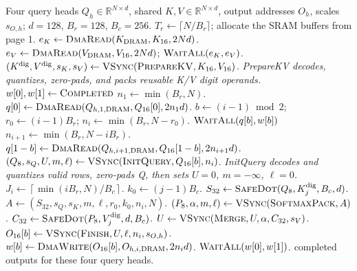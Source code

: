 \documentclass[11pt]{article}
\newcommand{\VSync}{\textsc{VSync}}
\newcommand{\SafeDot}{\textsc{SafeDot}}
\begin{document}
\clearpage
\begin{algorithm}[H]
\caption{Control-CPU program for one batch item and one shared K/V head}
\label{alg:main}
\footnotesize
\begin{algorithmic}[1]
\Require Four query heads $Q_h\in\mathbb R^{N\times d}$, shared $K,V\in\mathbb R^{N\times d}$,
output addresses $O_h$, scales $s_{O,h}$; $d=128$, $B_r=128$, $B_c=256$.
\State $T_r\gets\lceil N/B_r\rceil$; allocate the SRAM buffers from page 1.
\State $e_K\gets\Call{DmaRead}{K_{\rm DRAM},K_{16},2Nd}$.
\State $e_V\gets\Call{DmaRead}{V_{\rm DRAM},V_{16},2Nd}$; $\Call{WaitAll}{e_K,e_V}$.
\State $(K^{\rm dig},V^{\rm dig},s_K,s_V)\gets\VSync(\textsc{PrepareKV},K_{16},V_{16})$.
\Statex \hspace{\algorithmicindent}\textit{PrepareKV decodes, quantizes, zero-pads, and packs reusable K/V digit operands.}
    \State $w[0],w[1]\gets\textsc{Completed}$ 
    \State $n_1\gets\min(B_r,N)$.
    \State $q[0]\gets\Call{DmaRead}{Q_{h,1,\rm DRAM},Q_{16}[0],2n_1d}$.
        \State $b\gets(i-1)\bmod2$; $r_0\gets(i-1)B_r$; $n_i\gets\min(B_r,N-r_0)$.
        \State $\Call{WaitAll}{q[b],w[b]}$ 
            \State $n_{i+1}\gets\min(B_r,N-iB_r)$.
            \State $q[1-b]\gets\Call{DmaRead}{Q_{h,i+1,\rm DRAM},Q_{16}[1-b],2n_{i+1}d}$.
        \EndIf
        \State $(Q_8,s_Q,U,m,\ell)\gets\VSync(\textsc{InitQuery},Q_{16}[b],n_i)$.
        \Statex \hspace{\algorithmicindent}\hspace{\algorithmicindent}\textit{InitQuery decodes and quantizes valid rows, zero-pads Q, then sets $U=0$, $m=-\infty$, $\ell=0$.}
        \State $J_i\gets\left\lceil\min(iB_r,N)/B_c\right\rceil$.
            \State $k_0\gets(j-1)B_c$.
            \State $S_{32}\gets\SafeDot(Q_8,K^{\rm dig}_j,B_c,d)$.
            \State $A\gets(S_{32},s_Q,s_K,m,\ell,r_0,k_0,n_i,N)$.
            \State $(P_8,\alpha,m,\ell)\gets\VSync(\textsc{SoftmaxPack},A)$.
            \State $C_{32}\gets\SafeDot(P_8,V^{\rm dig}_j,d,B_c)$.
            \State $U\gets\VSync(\textsc{Merge},U,\alpha,C_{32},s_V)$.
        \EndFor
        \State $O_{16}[b]\gets\VSync(\textsc{Finish},U,\ell,n_i,s_{O,h})$.
        \State $w[b]\gets\Call{DmaWrite}{O_{16}[b],O_{h,i,\rm DRAM},2n_id}$.
    \EndFor
    \State $\Call{WaitAll}{w[0],w[1]}$.
\EndFor
\State \Return completed outputs for these four query heads.
\end{algorithmic}
\end{algorithm}
\end{document}
